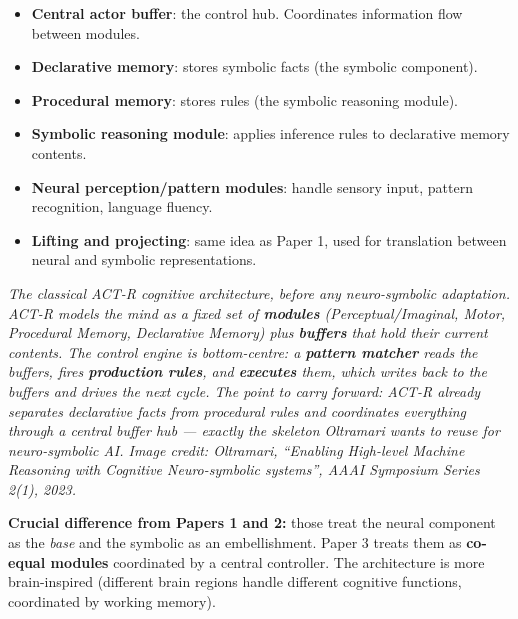 \documentclass[11pt, a4paper]{article}
\begin{document}
\begin{itemize}
  \item \textbf{Central actor buffer}: the control hub. Coordinates information flow between modules.
  \item \textbf{Declarative memory}: stores symbolic facts (the symbolic component).
  \item \textbf{Procedural memory}: stores rules (the symbolic reasoning module).
  \item \textbf{Symbolic reasoning module}: applies inference rules to declarative memory contents.
  \item \textbf{Neural perception/pattern modules}: handle sensory input, pattern recognition, language fluency.
  \item \textbf{Lifting and projecting}: same idea as Paper 1, used for translation between neural and symbolic representations.
\end{itemize}

\begin{center}

\footnotesize\textit{The classical ACT-R cognitive architecture, before any neuro-symbolic adaptation. ACT-R models the mind as a fixed set of \textbf{modules} (Perceptual/Imaginal, Motor, Procedural Memory, Declarative Memory) plus \textbf{buffers} that hold their current contents. The control engine is bottom-centre: a \textbf{pattern matcher} reads the buffers, fires \textbf{production rules}, and \textbf{executes} them, which writes back to the buffers and drives the next cycle. The point to carry forward: ACT-R already separates declarative facts from procedural rules and coordinates everything through a central buffer hub --- exactly the skeleton Oltramari wants to reuse for neuro-symbolic AI. Image credit: Oltramari, ``Enabling High-level Machine Reasoning with Cognitive Neuro-symbolic systems'', AAAI Symposium Series 2(1), 2023.}
\end{center}

\textbf{Crucial difference from Papers 1 and 2:} those treat the neural component as the \emph{base} and the symbolic as an embellishment. Paper 3 treats them as \textbf{co-equal modules} coordinated by a central controller. The architecture is more brain-inspired (different brain regions handle different cognitive functions, coordinated by working memory).
\end{document}
